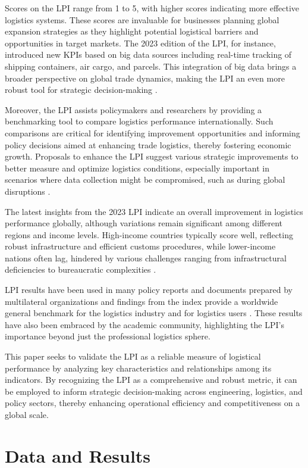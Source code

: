 \documentclass[sigconf]{acmart}
\begin{document}
Scores on the LPI range from 1 to 5, with higher scores indicating more effective logistics systems. These scores are invaluable for businesses planning global expansion strategies as they highlight potential logistical barriers and opportunities in target markets. The 2023 edition of the LPI, for instance, introduced new KPIs based on big data sources including real-time tracking of shipping containers, air cargo, and parcels. This integration of big data brings a broader perspective on global trade dynamics, making the LPI an even more robust tool for strategic decision-making \cite{arvis2023}.

Moreover, the LPI assists policymakers and researchers by providing a benchmarking tool to compare logistics performance internationally. Such comparisons are critical for identifying improvement opportunities and informing policy decisions aimed at enhancing trade logistics, thereby fostering economic growth. Proposals to enhance the LPI suggest various strategic improvements to better measure and optimize logistics conditions, especially important in scenarios where data collection might be compromised, such as during global disruptions \cite{rezaei2018, beysenbaev2020}.

The latest insights from the 2023 LPI indicate an overall improvement in logistics performance globally, although variations remain significant among different regions and income levels. High-income countries typically score well, reflecting robust infrastructure and efficient customs procedures, while lower-income nations often lag, hindered by various challenges ranging from infrastructural deficiencies to bureaucratic complexities \cite{arvis2023}.

LPI results have been used in many policy reports and documents prepared by multilateral organizations and findings from the index provide a worldwide general benchmark for the logistics industry and for logistics users \cite{WBreport2018}. These results have also been embraced by the academic community, highlighting the LPI's importance beyond just the professional logistics sphere.

This paper seeks to validate the LPI as a reliable measure of logistical performance by analyzing key characteristics and relationships among its indicators. By recognizing the LPI as a comprehensive and robust metric, it can be employed to inform strategic decision-making across engineering, logistics, and policy sectors, thereby enhancing operational efficiency and competitiveness on a global scale.
\section{Data and Results}
\end{document}
